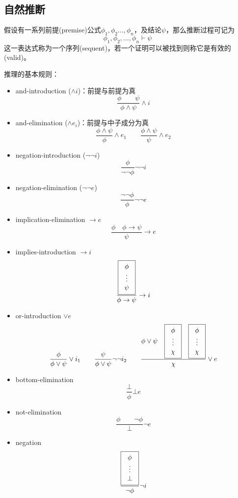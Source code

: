 \subsection{自然推断}
\begin{definition}
假设有一系列前提(premise)公式$\phi_1,\phi_2\ldots,\phi_n$，及结论$\psi$，那么推断过程可记为
\[\phi_1,\phi_2,\ldots,\phi_n\vdash\psi\]
这一表达式称为一个序列(sequent)，若一个证明可以被找到则称它是有效的(valid)。
\end{definition}

推理的基本规则：
\begin{itemize}
	\item and-introduction ($\land i$)：前提与前提为真
	\[\frac{\phi\qquad\psi}{\phi\land\psi}\land i\]
	\item and-elimination ($\land e_i$)：前提与中子成分为真
	\[\frac{\phi\land\psi}{\phi}\land e_1\qquad \frac{\phi\land\psi}{\psi}\land e_2\]
	\item negation-introduction ($\lnot\lnot i$)
	\[\frac{\phi}{\lnot\lnot\phi}\lnot\lnot i\]
	\item negation-elimination ($\lnot\lnot e$)
	\[\frac{\lnot\lnot\phi}{\phi}\lnot\lnot e\]
	\item implication-elimination $\to e$
	\[\frac{\phi\quad \phi\to\psi}{\psi}\to e\]
	\item implies-introduction $\to i$
	\[\dfrac{\fbox{\begin{tabular}{c}$\phi$\\$\vdots$\\$\psi$\end{tabular}}}{\phi\to\psi}\to i\]
	\item or-introduction $\lor e$
	\[\frac{\phi}{\phi\lor\psi}\lor i_1\qquad
	\frac{\psi}{\phi\lor\psi}\lnot\lnot i_2\qquad
	\frac{\phi\lor\psi\quad \fbox{\begin{tabular}{c}$\phi$\\$\vdots$\\$\chi$\end{tabular}}\quad \fbox{\begin{tabular}{c}$\phi$\\$\vdots$\\$\chi$\end{tabular}}}{\chi}\lor e\]
	\item bottom-elimination
	\[\frac{\bot}{\phi}\bot e\]
	\item not-elimination
	\[\frac{\phi\qquad\lnot\phi}{\bot}\lnot e\]
	\item negation
	\[\frac{\fbox{\begin{tabular}{c}$\phi$\\$\vdots$\\$\bot$\end{tabular}}}{\lnot \phi}\lnot i\]

\end{itemize}
